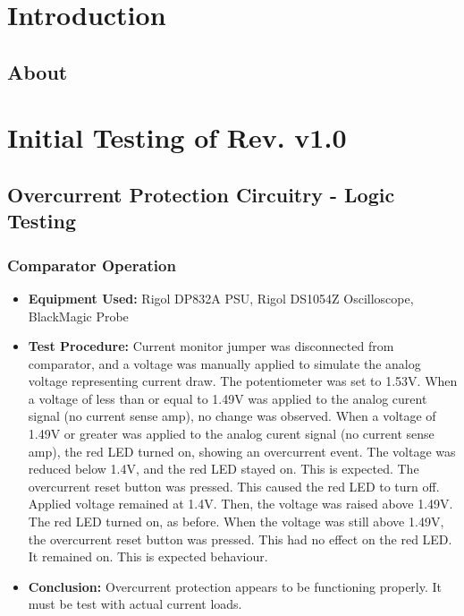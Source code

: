 
\tableofcontents


\chapter{Introduction}

\section{About}

\chapter{Initial Testing of Rev. v1.0}
\section{Overcurrent Protection Circuitry - Logic Testing}
\subsection{Comparator Operation}
  \begin{itemize}
        \item \textbf{Equipment Used:} Rigol DP832A PSU, Rigol DS1054Z Oscilloscope, BlackMagic Probe
        \item \textbf{Test Procedure:} Current monitor jumper was disconnected from comparator, and a voltage was manually applied to simulate the analog voltage representing current draw. The potentiometer was set to 1.53V. When a voltage of less than or equal to 1.49V was applied to the analog curent signal (no current sense amp), no change was observed. When a voltage of 1.49V or greater was applied to the analog curent signal (no current sense amp), the red LED turned on, showing an overcurrent event. The voltage was reduced below 1.4V, and the red LED stayed on. This is expected. The overcurrent reset button was pressed. This caused the red LED to turn off. Applied voltage remained at 1.4V. Then, the voltage was raised above 1.49V. The red LED turned on, as before. When the voltage was still above 1.49V, the overcurrent reset button was pressed. This had no effect on the red LED. It remained on. This is expected behaviour.
        \item \textbf{Conclusion:} Overcurrent protection appears to be functioning properly. It must be test with actual current loads.
  \end{itemize}
